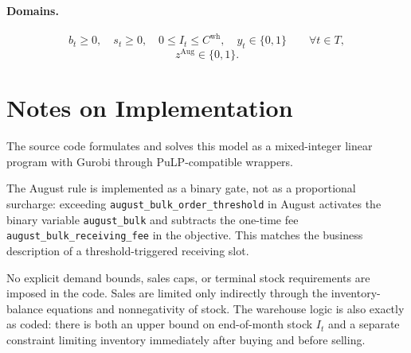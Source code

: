 \paragraph{Domains.}
\[
b_t \ge 0,\quad s_t \ge 0,\quad 0\le I_t \le C^{\text{wh}},\quad y_t\in\{0,1\}\qquad \forall t\in T,
\]
\[
z^{\text{Aug}} \in \{0,1\}.
\]

\section*{Notes on Implementation}

The source code formulates and solves this model as a mixed-integer linear program with Gurobi through PuLP-compatible wrappers.

The August rule is implemented as a binary gate, not as a proportional surcharge: exceeding \texttt{august\_bulk\_order\_threshold} in August activates the binary variable \texttt{august\_bulk} and subtracts the one-time fee \texttt{august\_bulk\_receiving\_fee} in the objective. This matches the business description of a threshold-triggered receiving slot.

No explicit demand bounds, sales caps, or terminal stock requirements are imposed in the code. Sales are limited only indirectly through the inventory-balance equations and nonnegativity of stock. The warehouse logic is also exactly as coded: there is both an upper bound on end-of-month stock \(I_t\) and a separate constraint limiting inventory immediately after buying and before selling.
